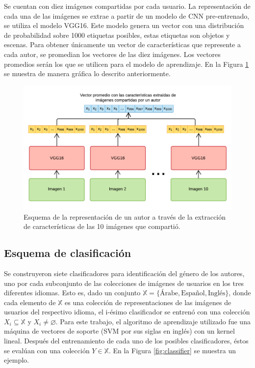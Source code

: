 \documentclass[runningheads]{llncs}
\begin{document}
Se cuentan con diez imágenes compartidas por cada usuario. La representación
de cada una de las imágenes se extrae a partir de un modelo de CNN
pre-entrenado, se utiliza el modelo VGG16.
Este modelo genera un vector con una distribución 
de probabilidad sobre 1000 etiquetas posibles, estas etiquetas son objetos 
y escenas. Para obtener únicamente un vector de características que represente
a cada autor, se promedian los vectores de las diez imágenes. Los vectores
promedios serán los que se utilicen para el modelo de aprendizaje. En la Figura 
\ref{fig:img_representation} se muestra de manera gráfica lo descrito anteriormente.

\begin{figure}
    \centering
    \includegraphics[scale=0.3]{img/features_extraction.png}
    \caption{Esquema de la representación de un autor a través de la extracción
    de características de las 10 imágenes que compartió.}
    \label{fig:img_representation}
\end{figure}

\subsection{Esquema de clasificación}

Se construyeron siete clasificadores para identificación del género de los autores, 
uno por cada subconjunto de las colecciones de imágenes de usuarios en los tres 
diferentes idiomas. Esto es, dado un conjunto $\mathbb{X} = \{\text{Árabe}, 
\text{Español}, \text{Inglés}\}$, donde cada elemento de $\mathbb{X}$ es una colección
de representaciones de las imágenes de 
usuarios del respectivo idioma, el i-ésimo clasificador se entrenó con una colección 
$X_i \subseteq \mathbb{X}$ y $X_i \neq \varnothing$. Para este trabajo,
el algoritmo de aprendizaje utilizado fue una máquina de vectores de soporte (SVM por 
sus siglas en inglés) con un kernel lineal. Después del entrenamiento 
de cada uno de los posibles clasificadores, éstos se evalúan con una colección $Y \in \mathbb{X}$. 
En la Figura \ref{fig:classifier} se muestra un ejemplo.
\end{document}
